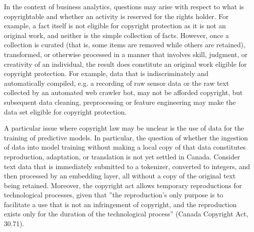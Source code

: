 In the context of business analytics, questions may arise with respect to what is copyrightable and whether an activity is reserved for the rights holder. For example, a fact itself is not eligible for copyright protection as it is not an original work, and neither is the simple collection of facts. However, once a collection is curated (that is, some items are removed while others are retained), transformed, or otherwise processed in a manner that involves skill, judgment, or creativity of an individual, the result does constitute an original work eligible for copyright protection. For example, data that is indiscriminately and automatically compiled, e.g. a recording of raw sensor data or the raw text collected by an automated web crawler bot, may not be afforded copyright, but subsequent data cleaning, preprocessing or feature engineering may make the data set eligible for copyright protection.

A particular issue where copyright law may be unclear is the use of data for the training of predictive models. In particular, the question of whether the ingestion of data into model training without making a local copy of that data constitutes reproduction, adaptation, or translation is not yet settled in Canada. Consider text data that is immediately submitted to a tokenizer, converted to integers, and then processed by an embedding layer, all without a copy of the original text being retained. Moreover, the copyright act allows temporary reproductions for technological processes, given that ''the reproduction's only purpose is to facilitate a use that is not an infringement of copyright, and the reproduction exists only for the duration of the technological process'' (Canada Copyright Act, 30.71).

